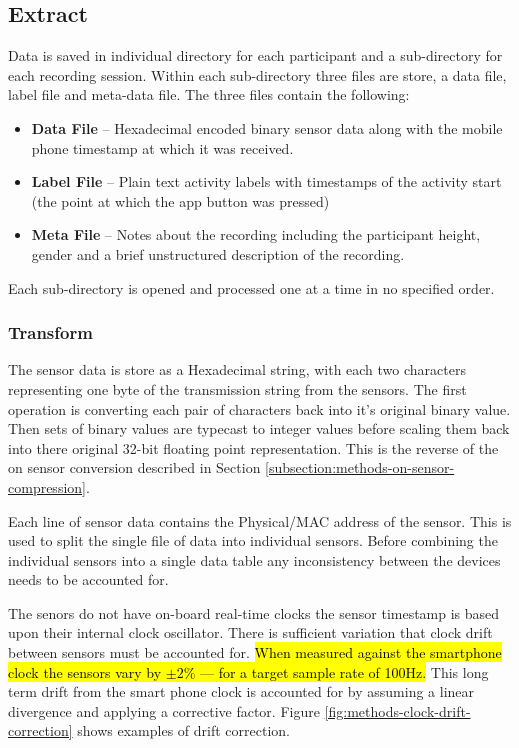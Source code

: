 \subsection{Extract} %
Data is saved in individual directory for each participant and a sub-directory for each recording session. Within each sub-directory three files are store, a data file, label file and meta-data file. The three files contain the following:
\begin{itemize}
    \item \textbf{Data File} -- Hexadecimal encoded binary sensor data along with the mobile phone timestamp at which it was received.
    \item \textbf{Label File} -- Plain text activity labels with timestamps of the activity start (the point at which the app button was pressed)
    \item \textbf{Meta File} -- Notes about the recording including the participant height, gender and a brief unstructured description of the recording.
\end{itemize}

Each sub-directory is opened and processed one at a time in no specified order.

\subsubsection{Transform}
The sensor data is store as a Hexadecimal string, with each two characters representing one byte of the transmission string from the sensors. The first operation is converting each pair of characters back into it's original binary value. Then sets of binary values are typecast to integer values before scaling them back into there original 32-bit floating point representation. This is the reverse of the on sensor conversion described in Section \ref{subsection:methods-on-sensor-compression}.

Each line of sensor data contains the Physical/MAC address of the sensor. This is used to split the single file of data into individual sensors. Before combining the individual sensors into a single data table any inconsistency between the devices needs to be accounted for.

The senors do not have on-board real-time clocks the sensor timestamp is based upon their internal clock oscillator. There is sufficient variation that clock drift between sensors must be accounted for. \hl{When measured against the smartphone clock the sensors vary by $\pm2\%$ --- for a target sample rate of 100Hz.} This long term drift from the smart phone clock is accounted for by assuming a linear divergence and applying a corrective factor. Figure \ref{fig:methods-clock-drift-correction} shows examples of drift correction.

